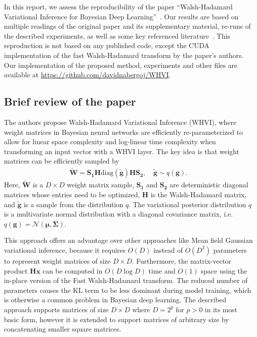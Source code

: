 In this report, we assess the reproducibility of the paper ``Walsh-Hadamard Variational Inference for Bayesian Deep Learning''~\cite{rossi2019walsh}.
Our results are based on multiple readings of the original paper and its supplementary material, re-runs of the described experiments, as well as some key referenced literature~\cite{le2014fastfood, blundell2015weight, fino1976unified, kingma2015variational, rossi2019good}.
This reproduction is not based on any published code, except the CUDA implementation of the fast Walsh-Hadamard transform by the paper's authors.
Our implementation of the proposed method, experiments and other files are available at \url{https://github.com/davidnabergoj/WHVI}.

\subsection{Brief review of the paper}\label{subsec:brief-review-of-the-paper}
The authors propose Walsh-Hadamard Variational Inference (WHVI), where weight matrices in Bayesian neural networks are efficiently re-parameterized to allow for linear space complexity and log-linear time complexity when transforming an input vector with a WHVI layer.
The key idea is that weight matrices can be efficiently sampled by
\begin{align}
    \widetilde{\mathbf{W}} = \mathbf{S_1} \mathbf{H} \mathrm{diag}(\widetilde{\mathbf{g}}) \mathbf{H} \mathbf{S_2},\quad\widetilde{\mathbf{g}} \sim q(\mathbf{g}).
    \label{eqn:weight-sampling}
\end{align}
Here, $\widetilde{\mathbf{W}}$ is a $D \times D$ weight matrix sample, $\mathbf{S_1}$ and $\mathbf{S_2}$ are deterministic diagonal matrices whose entries need to be optimized, $\mathbf{H}$ is the Walsh-Hadamard matrix, and $\widetilde{\mathbf{g}}$ is a sample from the distribution $q$.
The variational posterior distribution $q$ is a multivariate normal distribution with a diagonal covariance matrix, i.e.\ $q(\mathbf{g}) = \mathcal{N}(\mathbf{\mu}, \mathbf{\Sigma})$.

This approach offers an advantage over other approaches like Mean field Gaussian variational inference, because it requires $O(D)$ instead of $O(D^2)$ parameters to represent weight matrices of size $D \times D$.
Furthermore, the matrix-vector product $\mathbf{Hx}$ can be computed in $O(D \log D)$ time and $O(1)$ space using the in-place version of the Fast Walsh-Hadamard transform.
The reduced number of parameters causes the KL term to be less dominant during model training, which is otherwise a common problem in Bayesian deep learning.
The described approach supports matrices of size $D \times D$ where $D = 2^p$ for $p > 0$ in its most basic form, however it is extended to support matrices of arbitrary size by concatenating smaller square matrices.

